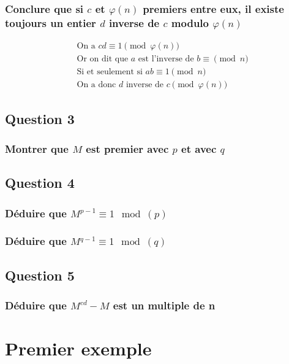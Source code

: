 \documentclass[a4paper,10pt]{article}
\begin{document}
\subsubsection{Conclure que si $c$ et $\varphi(n)$ premiers entre eux, il existe toujours un entier $d$ inverse de $c$ modulo $\varphi(n)$}

\begin{align*}
&\text{On a } cd \equiv 1 \pmod{\varphi(n)}\\
&\text{Or on dit que $a$ est l'inverse de $b \equiv \pmod n$}\\
&\text{Si et seulement si $ab \equiv 1 \pmod n$}\\
&\text{On a donc $d$ inverse de $c \pmod{\varphi(n)}$}
\end{align*}

\subsection{Question 3}
\subsubsection{Montrer que $M$ est premier avec $p$ et avec $q$}


\subsection{Question 4}
\subsubsection{Déduire que $M^{p-1} \equiv 1 \mod(p)$}

\subsubsection{Déduire que $M^{q-1} \equiv 1 \mod(q)$}

\subsection{Question 5}
\subsubsection{Déduire que $M^{cd} - M$ est un multiple de n}

\clearpage
\section{Premier exemple}
\end{document}
